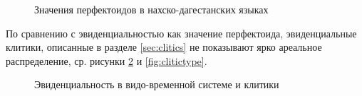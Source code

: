 \begin{figure}[H]
\centering
\caption{Значения перфектоидов в нахско-дагестанских языках}
\label{fig:pfsemmap}
\vspace{0.7cm}
\end{figure}

По сравнению с эвиденциальностью как значение перфектоида, эвиденциальные клитики, описанные в разделе \ref{sec:clitics} не показывают ярко ареальное распределение, ср. рисунки \ref{fig:tensepart} и \ref{fig:clitictype}.

\vfill
\pagebreak

\begin{figure}[H]
\centering
\caption{Эвиденциальность в видо-временной системе и клитики}
\label{fig:tensepart}
\vspace{0.7cm}
\end{figure}

